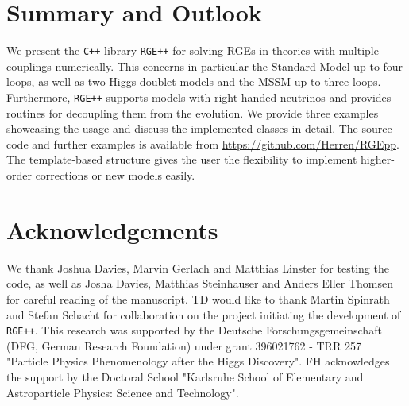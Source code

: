 \documentclass[11pt,a4paper]{article}
\begin{document}
\section{\label{sec::sum}Summary and Outlook}
We present the \texttt{C++} library \texttt{RGE++} for solving RGEs in theories with multiple couplings numerically. This concerns in particular the Standard Model up to four loops, as well as
two-Higgs-doublet models and the MSSM up to three loops. Furthermore, \texttt{RGE++} supports models with right-handed neutrinos and provides routines for decoupling them from the evolution.
We provide three examples showcasing the usage and discuss the implemented classes in detail. The source code and further examples is available from \url{https://github.com/Herren/RGEpp}.
The template-based structure gives the user the flexibility to implement higher-order corrections or new models easily.

\section*{Acknowledgements}
We thank Joshua Davies, Marvin Gerlach and Matthias Linster for testing the code, as well as Josha Davies, Matthias Steinhauser and Anders Eller Thomsen for careful reading of the manuscript.
TD would like to thank Martin Spinrath and Stefan Schacht for collaboration on the project initiating the development of \texttt{RGE++}.
This research was supported by the Deutsche Forschungsgemeinschaft (DFG, German Research Foundation) under grant 396021762 - TRR 257 "Particle Physics Phenomenology after the Higgs Discovery".
FH acknowledges the support by the Doctoral School "Karlsruhe School of Elementary and Astroparticle Physics: Science and Technology".

\printbibliography
\end{document}
